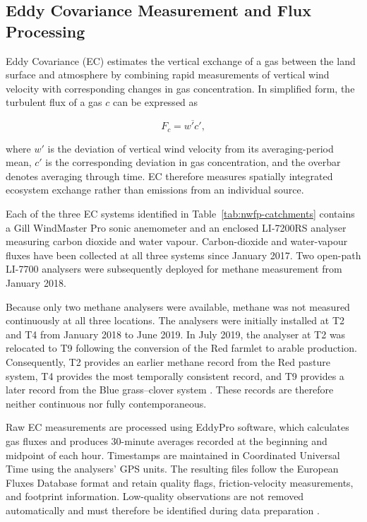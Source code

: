 \subsection{Eddy Covariance Measurement and Flux Processing}

Eddy Covariance (EC) estimates the vertical exchange of a gas between the land
surface and atmosphere by combining rapid measurements of vertical wind velocity
with corresponding changes in gas concentration. In simplified form, the
turbulent flux of a gas \(c\) can be expressed as

\begin{equation}
    F_c = \overline{w'c'},
\end{equation}

where \(w'\) is the deviation of vertical wind velocity from its
averaging-period mean, \(c'\) is the corresponding deviation in gas
concentration, and the overbar denotes averaging through time. EC therefore
measures spatially integrated ecosystem exchange rather than emissions from an
individual source.

Each of the three EC systems identified in
Table~\ref{tab:nwfp-catchments} contains a Gill WindMaster Pro sonic anemometer
and an enclosed LI-7200RS analyser measuring carbon dioxide and water vapour.
Carbon-dioxide and water-vapour fluxes have been collected at all three systems
since January 2017. Two open-path LI-7700 analysers were subsequently deployed
for methane measurement from January 2018.

Because only two methane analysers were available, methane was not measured
continuously at all three locations. The analysers were initially installed at
T2 and T4 from January 2018 to June 2019. In July 2019, the analyser at T2 was
relocated to T9 following the conversion of the Red farmlet to arable
production. Consequently, T2 provides an earlier methane record from the Red
pasture system, T4 provides the most temporally consistent record, and T9
provides a later record from the Blue grass--clover system
\cite{olde2023ec}. These records are therefore neither continuous nor fully
contemporaneous.

Raw EC measurements are processed using EddyPro software, which calculates gas
fluxes and produces 30-minute averages recorded at the beginning and midpoint
of each hour. Timestamps are maintained in Coordinated Universal Time using the
analysers' GPS units. The resulting files follow the European Fluxes Database
format and retain quality flags, friction-velocity measurements, and footprint
information. Low-quality observations are not removed automatically and must
therefore be identified during data preparation \cite{olde2023ec}.

